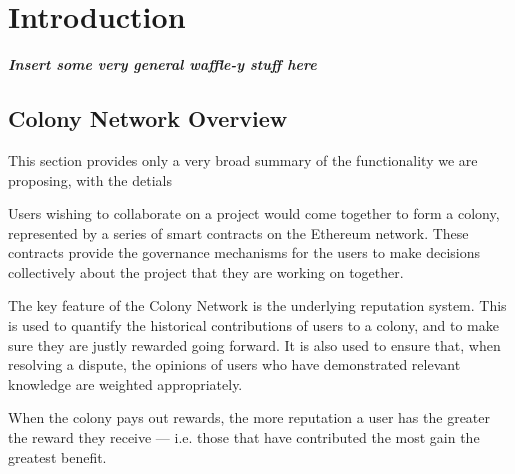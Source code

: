 \section{Introduction}


\textbf{\emph{Insert some very general waffle-y stuff here}}

\subsection{Colony Network Overview}
This section provides only a very broad summary of the functionality we are proposing, with the detials

Users wishing to collaborate on a project would come together to form a colony, represented by a series of smart contracts on the Ethereum network. These contracts provide the governance mechanisms for the users to make decisions collectively about the project that they are working on together.

The key feature of the Colony Network is the underlying reputation system. This is used to quantify the historical contributions of users to a colony, and to make sure they are justly rewarded going forward. It is also used to ensure that, when resolving a dispute, the opinions of users who have demonstrated relevant knowledge are weighted appropriately. 

When the colony pays out rewards, the more reputation a user has the greater the reward they receive --- i.e. those that have contributed the most gain the greatest benefit.